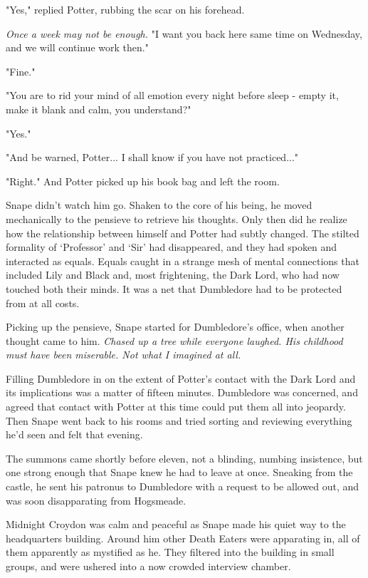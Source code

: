 \documentclass[a4paper,11pt]{article}
\begin{document}
"Yes," replied Potter, rubbing the scar on his forehead.

\emph{Once a week may not be enough.} "I want you back here same time on Wednesday, and we will continue work then."

"Fine."

"You are to rid your mind of all emotion every night before sleep - empty it, make it blank and calm, you understand?"

"Yes."

"And be warned, Potter... I shall know if you have not practiced..."

"Right." And Potter picked up his book bag and left the room.

Snape didn't watch him go. Shaken to the core of his being, he moved mechanically to the pensieve to retrieve his thoughts. Only then did he realize how the relationship between himself and Potter had subtly changed. The stilted formality of `Professor' and `Sir' had disappeared, and they had spoken and interacted as equals. Equals caught in a strange mesh of mental connections that included Lily and Black and, most frightening, the Dark Lord, who had now touched both their minds. It was a net that Dumbledore had to be protected from at all costs.

Picking up the pensieve, Snape started for Dumbledore's office, when another thought came to him. \emph{Chased up a tree while everyone laughed. His childhood must have been miserable. Not what I imagined at all.}

Filling Dumbledore in on the extent of Potter's contact with the Dark Lord and its implications was a matter of fifteen minutes. Dumbledore was concerned, and agreed that contact with Potter at this time could put them all into jeopardy. Then Snape went back to his rooms and tried sorting and reviewing everything he'd seen and felt that evening.

The summons came shortly before eleven, not a blinding, numbing insistence, but one strong enough that Snape knew he had to leave at once. Sneaking from the castle, he sent his patronus to Dumbledore with a request to be allowed out, and was soon disapparating from Hogsmeade.

Midnight Croydon was calm and peaceful as Snape made his quiet way to the headquarters building. Around him other Death Eaters were apparating in, all of them apparently as mystified as he. They filtered into the building in small groups, and were ushered into a now crowded interview chamber.
\end{document}
